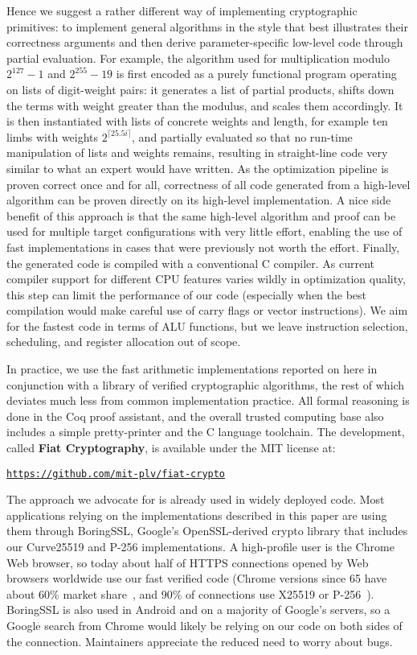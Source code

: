 \documentclass[conference,letterpaper]{IEEEtran}
\begin{document}
Hence we suggest a rather different way of implementing cryptographic primitives:
to implement general algorithms in the style that best illustrates their correctness arguments
and then derive parameter-specific low-level code through partial evaluation.
For example, the algorithm used for multiplication modulo $2^{127}-1$ and $2^{255}-19$ is first encoded as a purely functional program operating on lists of digit-weight pairs: it generates a list of partial products, shifts down the terms with weight greater than the modulus, and scales them accordingly.
It is then instantiated with lists of concrete weights and length, for example ten limbs with weights $2^{\lceil 25.5 i\rceil}$, and partially evaluated so that no run-time manipulation of lists and weights remains, resulting in straight-line code very similar to what an expert would have written.
As the optimization pipeline is proven correct once and for all, correctness of all code generated from a high-level algorithm can be proven directly on its high-level implementation.
A nice side benefit of this approach is that the same high-level algorithm and proof can be used for multiple target configurations with very little effort, enabling the use of fast implementations in cases that were previously not worth the effort.
Finally, the generated code is compiled with a conventional C compiler.
As current compiler support for different CPU features varies wildly in optimization quality, this step can limit the performance of our code (especially when the best compilation would make careful use of carry flags or vector instructions).
We aim for the fastest code in terms of ALU functions, but we leave instruction selection, scheduling, and register allocation out of scope.


In practice, we use the fast arithmetic implementations reported on here in conjunction with a library of verified cryptographic algorithms, the rest of which deviates much less from common implementation practice.
All formal reasoning is done in the Coq proof assistant, and the overall trusted computing base also includes a simple pretty-printer and the C language toolchain.
The development, called \textbf{Fiat Cryptography}, is available under the MIT license at:
\begin{center}
  \texttt{\url{https://github.com/mit-plv/fiat-crypto}}
\end{center}

The approach we advocate for is already used in widely deployed code.
Most applications relying on the implementations described in this paper are using them through BoringSSL, Google's OpenSSL-derived crypto library that includes our Curve25519 and P-256 implementations.
A high-profile user is the Chrome Web browser, so today about half of HTTPS connections opened by Web browsers worldwide use our fast verified code (Chrome versions since 65 have about 60\% market share~\cite{browserMarketShare}, and 90\% of connections use X25519 or P-256~\cite{davidenTLSECC}).
BoringSSL is also used in Android and on a majority of Google's servers, so a Google search from Chrome would likely be relying on our code on both sides of the connection.
Maintainers appreciate the reduced need to worry about bugs.
\end{document}
